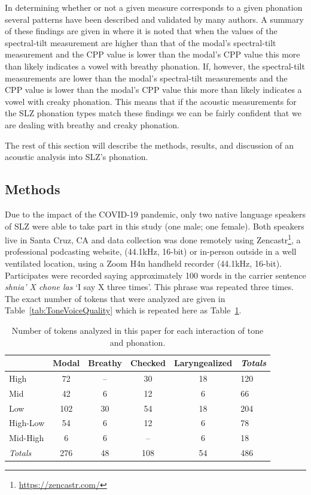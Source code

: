 \documentclass[12pt, letterpaper]{article}
\providecommand{\lsptoprule}{\midrule\toprule}
\providecommand{\lspbottomrule}{\bottomrule\midrule}
\begin{document}
In determining whether or not a given measure corresponds to a given phonation several patterns have been described and validated by many authors. A summary of these findings are given in \citet{garellekPhoneticsVoice2019} where it is noted that when the values of the spectral-tilt measurement are higher than that of the modal's spectral-tilt measurement and the CPP value is lower than the modal's CPP value this more than likely indicates a vowel with breathy phonation. If, however, the spectral-tilt measurements are lower than the modal's spectral-tilt measurements and the CPP value is lower than the modal's CPP value this more than likely indicates a vowel with creaky phonation. This means that if the acoustic measurements for the SLZ phonation types match these findings we can be fairly confident that we are dealing with breathy and creaky phonation. 

The rest of this section will describe the methods, results, and discussion of an acoustic analysis into SLZ's phonation. 

\subsection{Methods} \label{sec:Methods}

Due to the impact of the COVID-19 pandemic, only two native language speakers of SLZ were able to take part in this study (one male; one female). Both speakers live in Santa Cruz, CA and data collection was done remotely using Zencastr\footnote{\href{https://zencastr.com/}{https://zencastr.com/}}, a professional podcasting website, (44.1kHz, 16-bit) or in-person outside in a well ventilated location, using a Zoom H4n handheld recorder (44.1kHz, 16-bit). Participates were recorded saying approximately 100 words in the carrier sentence \textit{shnia' X chone las} `I say X three times'. This phrase was repeated three times. The exact number of tokens that were analyzed are given in Table~\ref{tab:ToneVoiceQuality} which is repeated here as Table~\ref{tab:Interaction}. 

\begin{table}[!h]
	\caption{Number of tokens analyzed in this paper for each interaction of tone and phonation.}
	\label{tab:Interaction}
	\centering

	\begin{tabular}{lccccl}
	\lsptoprule
		& \textbf{Modal} & \textbf{Breathy} & \textbf{Checked} & \textbf{Laryngealized} & \textit{Totals} \\
	\hline
	High		& 72 & -- & 30	& 18 & 120 \\
	Mid			& 42 & 6  & 12	& 6 & 66 \\
	Low			& 102 & 30  & 54 & 18 & 204 \\
	High-Low	& 54 & 6  & 12	& 6 & 78 \\
	Mid-High	& 6	 & 6  & --	& 6 & 18 \\
	\textit{Totals} & 276 & 48 & 108 & 54 & 486 \\
	\lspbottomrule
	\end{tabular}
\end{table}
\end{document}
